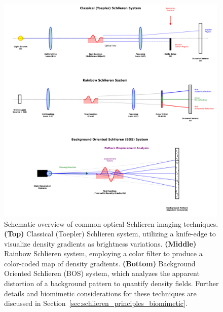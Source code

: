 \documentclass[11pt]{article}
\begin{document}
\begin{figure}[htbp]
    \centering
    \includegraphics[width=0.99\textwidth]{figures/classical_schlieren_system.png} %
    \caption{Schematic overview of common optical Schlieren imaging techniques.
    \textbf{(Top)} Classical (Toepler) Schlieren system, utilizing a knife-edge to visualize density gradients as brightness variations.
    \textbf{(Middle)} Rainbow Schlieren system, employing a color filter to produce a color-coded map of density gradients.
    \textbf{(Bottom)} Background Oriented Schlieren (BOS) system, which analyzes the apparent distortion of a background pattern to quantify density fields.
    Further details and biomimetic considerations for these techniques are discussed in Section~\ref{sec:schlieren_principles_biomimetic}.} %
    \label{fig:schlieren_systems_overview}
\end{figure}
\end{document}
